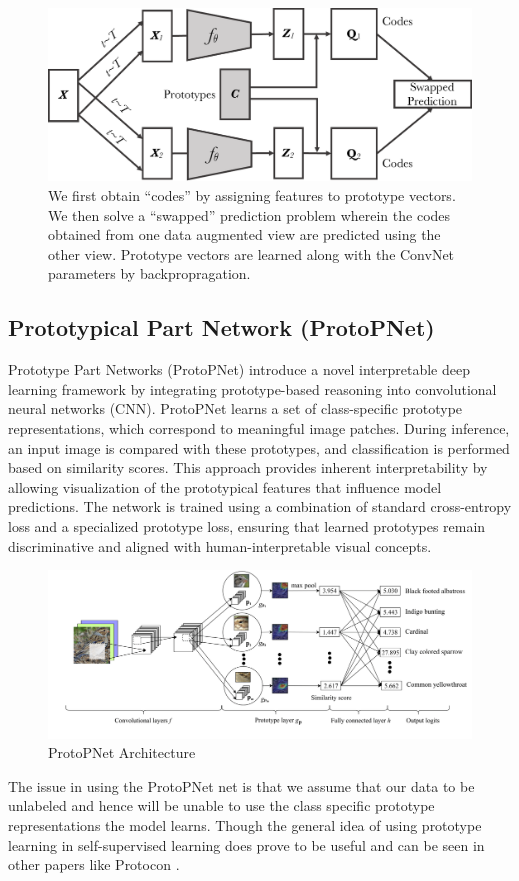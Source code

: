 \begin{figure}[t]
\includegraphics[height=.4\linewidth]{images/oto_simple.pdf}
\caption{
We first obtain ``codes'' by assigning features to prototype vectors.
We then solve a ``swapped'' prediction problem wherein the codes obtained from one data augmented view are predicted using the other view.
Prototype vectors are learned along with the ConvNet parameters by backpropragation. 
}
\end{figure}

\subsection{Prototypical Part Network (ProtoPNet)}

Prototype Part Networks (ProtoPNet) \cite{chen2019looks} introduce a novel interpretable deep learning framework by integrating prototype-based reasoning into convolutional neural networks (CNN). ProtoPNet learns a set of class-specific prototype representations, which correspond to meaningful image patches. During inference, an input image is compared with these prototypes, and classification is performed based on similarity scores. This approach provides inherent interpretability by allowing visualization of the prototypical features that influence model predictions. The network is trained using a combination of standard cross-entropy loss and a specialized prototype loss, ensuring that learned prototypes remain discriminative and aligned with human-interpretable visual concepts. 

\begin{figure}[t]\centering
\vspace{1.em}
\includegraphics[width=.75\linewidth]{images/ProtoPNet_Architecture.png}
\caption{ProtoPNet Architecture
\label{fig:teaser}}
\vspace{-1em}
\end{figure}

The issue in using the ProtoPNet net is that we assume that our data to be unlabeled and hence will be unable to use the class specific prototype representations the model learns. Though the general idea of using prototype learning in self-supervised learning does prove to be useful and can be seen in other papers like Protocon \cite{nassar2023protocon}.